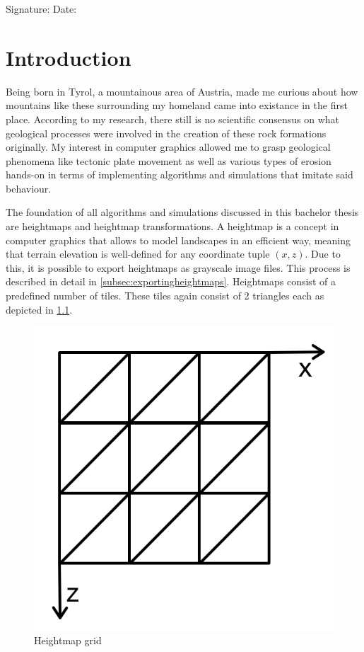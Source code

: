 \documentclass[11pt,a4paper,twoside,openright]{report}
\begin{document}
\vspace{15mm}

\noindent Signature: \underline{\hspace{5cm}} \hspace{1cm}  Date: \underline{\hspace{5cm}}


\chapter{Introduction}
\label{sec:intro}

\pagestyle{fancy}

Being born in Tyrol, a mountainous area of Austria, made me curious about how mountains like these surrounding my homeland came into existance in the first place. According to my research, there still is no scientific consensus on what geological processes were involved in the creation of these rock formations originally. My interest in computer graphics allowed me to grasp geological phenomena like tectonic plate movement as well as various types of erosion hands-on in terms of implementing algorithms and simulations that imitate said behaviour.

The foundation of all algorithms and simulations discussed in this bachelor thesis are heightmaps and heightmap transformations. A heightmap is a concept in computer graphics that allows to model landscapes in an efficient way, meaning that terrain elevation is well-defined for any coordinate tuple $(x,z)$. Due to this, it is possible to export heightmaps as grayscale image files. This process is described in detail in \cref{subsec:exportingheightmaps}. Heightmaps consist of a predefined number of tiles. These tiles again consist of 2 triangles each as depicted in \cref{fig:heightmapgrid}.

\begin{figure}[h]
\centering
\includegraphics[width=0.25\linewidth]{heightmapgrid.png}
\caption{Heightmap grid}\label{fig:heightmapgrid}
\end{figure}
\end{document}
